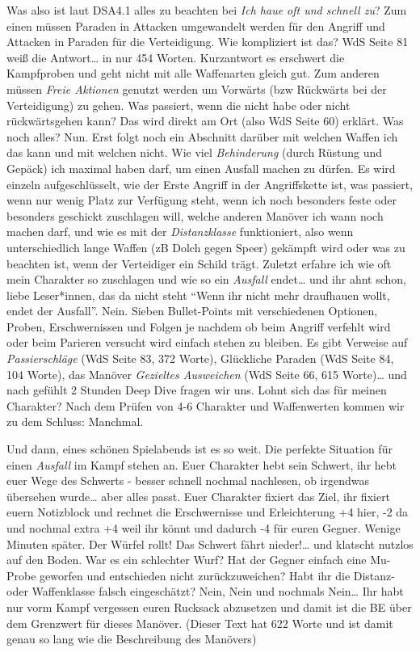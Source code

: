 \documentclass[final]{multiversum}
\begin{document}
Was also ist laut DSA4.1 alles zu beachten bei \emph{Ich haue oft und schnell
zu}?  Zum einen müssen Paraden in Attacken umgewandelt werden für den Angriff
und Attacken in Paraden für die Verteidigung. Wie kompliziert ist das? WdS Seite
81 weiß die Antwort… in nur 454 Worten. Kurzantwort es erschwert die Kampfproben
und geht nicht mit alle Waffenarten gleich gut. Zum anderen müssen \emph{Freie
Aktionen} genutzt werden um Vorwärts (bzw Rückwärts bei der Verteidigung) zu
gehen. Was passiert, wenn die nicht habe oder nicht rückwärtsgehen kann? Das
wird direkt am Ort (also WdS Seite 60) erklärt. Was noch alles? Nun. Erst folgt
noch ein Abschnitt darüber mit welchen Waffen ich das kann und mit welchen
nicht. Wie viel \emph{Behinderung} (durch Rüstung und Gepäck) ich maximal haben
darf, um einen Ausfall machen zu dürfen. Es wird einzeln aufgeschlüsselt, wie
der Erste Angriff in der Angriffskette ist, was passiert, wenn nur wenig Platz
zur Verfügung steht, wenn ich noch besonders feste oder besonders geschickt
zuschlagen will, welche anderen Manöver ich wann noch machen darf, und wie es
mit der \emph{Distanzklasse} funktioniert, also wenn unterschiedlich lange
Waffen (zB Dolch gegen Speer) gekämpft wird oder was zu beachten ist, wenn der
Verteidiger ein Schild trägt. Zuletzt erfahre ich wie oft mein Charakter so
zuschlagen und wie so ein \emph{Ausfall} endet\ldots{} und ihr ahnt schon, liebe
Leser*innen, das da nicht steht \enquote{Wenn ihr nicht mehr draufhauen wollt,
endet der Ausfall}. Nein. Sieben Bullet-Points mit verschiedenen Optionen,
Proben, Erschwernissen und Folgen je nachdem ob beim Angriff verfehlt wird oder
beim Parieren versucht wird einfach stehen zu bleiben. Es gibt Verweise auf
\emph{Passierschläge} (WdS Seite 83, 372 Worte), Glückliche Paraden (WdS Seite
84, 104 Worte), das Manöver \emph{Gezieltes Ausweichen} (WdS Seite 66, 615
Worte)\ldots{} und nach gefühlt 2 Stunden Deep Dive fragen wir uns. Lohnt sich das
für meinen Charakter? Nach dem Prüfen von 4-6 Charakter und Waffenwerten kommen
wir zu dem Schluss: Manchmal.

Und dann, eines schönen Spielabends ist es so weit. Die perfekte Situation für
einen \emph{Ausfall} im Kampf stehen an. Euer Charakter hebt sein Schwert, ihr
hebt euer Wege des Schwerts - besser schnell nochmal nachlesen, ob irgendwas
übersehen wurde… aber alles passt. Euer Charakter fixiert das Ziel, ihr fixiert
euern Notizblock und rechnet die Erschwernisse und Erleichterung +4 hier, -2 da
und nochmal extra +4 weil ihr könnt und dadurch -4 für euren Gegner. Wenige
Minuten später. Der Würfel rollt! Das Schwert fährt nieder!\ldots{} und klatscht
nutzlos auf den Boden. War es ein schlechter Wurf? Hat der Gegner einfach eine
Mu-Probe geworfen und entschieden nicht zurückzuweichen? Habt ihr die Distanz-
oder Waffenklasse falsch eingeschätzt? Nein, Nein und nochmals Nein… Ihr habt
nur vorm Kampf vergessen euren Rucksack abzusetzen und damit ist die BE über dem
Grenzwert für dieses Manöver.  (Dieser Text hat 622 Worte und ist damit genau so
lang wie die Beschreibung des Manövers) 
\end{document}
